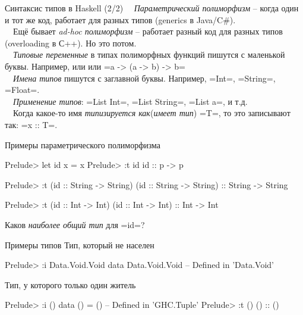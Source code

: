 \documentclass{beamer}
\begin{document}
\begin{frame}{Синтаксис типов в Haskell (2/2)}
~\ \emph{Параметрический полиморфизм} -- когда один и тот же код, работает для разных типов
(generics в Java/C\#).
\\
~\ Ещё бывает \emph{ad-hoc полиморфизм} -- работает разный код для разных типов (overloading в С++). Но это потом.
\\
~\ \emph{Типовые переменные} в типах полиморфных функций пишутся с маленькой буквы. Например,  или  или 
\hsinline=a -> (a -> b) -> b=
\vspace{0.5cm} 
\\ \pause
~\ \emph{Имена типов} пишутся с заглавной буквы. Например,  \inline=Int=, \inline=String=, \inline=Float=.
\vspace{0.5cm} 
\\ \pause
~\ \emph{Применение типов}: \inline=List Int=, \inline=List String=, \inline=List a=, и т.д.
\vspace{0.5cm} 
\\ \pause
~\ Когда какое-то имя \emph{типизируется как}(\emph{имеет тип}) \inline=T=, то это записывают так: \inline=x :: T=.
\end{frame}

\begin{frame}[fragile]{Примеры параметрического полиморфизма}
\begin{hslisting}
Prelude> let id x = x
Prelude> :t id
id :: p -> p
\end{hslisting}
\pause
\begin{hslisting}
Prelude> :t (id :: String -> String)
(id :: String -> String) :: String -> String
\end{hslisting}
\pause
\begin{hslisting}
Prelude> :t (id :: Int -> Int)
(id :: Int -> Int) :: Int -> Int
\end{hslisting}
{\Large \faQuestion} Каков \textit{наиболее общий тип} для \inline=id=?
\end{frame}

\begin{frame}[fragile]{Примеры типов}
Тип, который не населен
\begin{hslisting}
Prelude> :i Data.Void.Void
data Data.Void.Void        -- Defined in 'Data.Void'
\end{hslisting}

Тип, у которого только один житель
\begin{hslisting}
Prelude> :i ()
data () = ()               -- Defined in 'GHC.Tuple'
Prelude> :t ()
() :: ()
\end{hslisting}
\end{frame}
\end{document}
